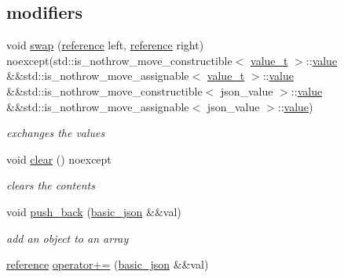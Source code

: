 \subsection*{modifiers}
\begin{DoxyCompactItemize}
\item 
void \hyperlink{classnlohmann_1_1basic__json_aee0ae36cbfb0336832ebc0374c3c7679}{swap} (\hyperlink{classnlohmann_1_1basic__json_a220ae98554a76205fb7f8822d36b2d5a}{reference} left, \hyperlink{classnlohmann_1_1basic__json_a220ae98554a76205fb7f8822d36b2d5a}{reference} right) noexcept(std\+::is\+\_\+nothrow\+\_\+move\+\_\+constructible$<$ \hyperlink{namespacenlohmann_1_1detail_a1ed8fc6239da25abcaf681d30ace4985}{value\+\_\+t} $>$\+::\hyperlink{classnlohmann_1_1basic__json_a11641b35219676b225d9bd15c7677659}{value} \&\&std\+::is\+\_\+nothrow\+\_\+move\+\_\+assignable$<$ \hyperlink{namespacenlohmann_1_1detail_a1ed8fc6239da25abcaf681d30ace4985}{value\+\_\+t} $>$\+::\hyperlink{classnlohmann_1_1basic__json_a11641b35219676b225d9bd15c7677659}{value} \&\&std\+::is\+\_\+nothrow\+\_\+move\+\_\+constructible$<$ json\+\_\+value $>$\+::\hyperlink{classnlohmann_1_1basic__json_a11641b35219676b225d9bd15c7677659}{value} \&\&std\+::is\+\_\+nothrow\+\_\+move\+\_\+assignable$<$ json\+\_\+value $>$\+::\hyperlink{classnlohmann_1_1basic__json_a11641b35219676b225d9bd15c7677659}{value})
\begin{DoxyCompactList}\small\item\em exchanges the values \end{DoxyCompactList}\item 
void \hyperlink{classnlohmann_1_1basic__json_a946cc8f30d8b1d6609b57387b647fe53}{clear} () noexcept
\begin{DoxyCompactList}\small\item\em clears the contents \end{DoxyCompactList}\item 
void \hyperlink{classnlohmann_1_1basic__json_ab9e0253c92736db021840105d374c4c4}{push\+\_\+back} (\hyperlink{classnlohmann_1_1basic__json}{basic\+\_\+json} \&\&val)
\begin{DoxyCompactList}\small\item\em add an object to an array \end{DoxyCompactList}\item 
\hyperlink{classnlohmann_1_1basic__json_a220ae98554a76205fb7f8822d36b2d5a}{reference} \hyperlink{classnlohmann_1_1basic__json_a40226d9c84fcb9cb948ae0c27b842c57}{operator+=} (\hyperlink{classnlohmann_1_1basic__json}{basic\+\_\+json} \&\&val)

\end{DoxyCompactItemize}

